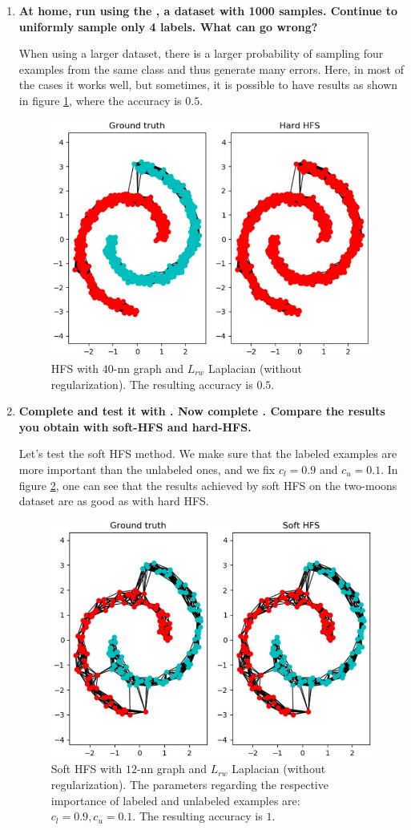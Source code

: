 \documentclass[a4paper, 11pt]{report}
\begin{document}
\begin{enumerate}
	\item \textbf{At home, run  using the , a dataset with 1000 samples. Continue to uniformly sample only 4 labels. What can go wrong?}
	
	When using a larger dataset, there is a larger probability of sampling four examples from the same class and thus generate many errors. Here, in most of the cases it works well, but sometimes, it is possible to have results as shown in figure \ref{fig:q12-hard-hfs-fail}, where the accuracy is $0.5$.
	
	\begin{figure}[!htb]
	    \centering
	    \includegraphics[width=.5\textwidth]{images/q12_hard-hfs-fail.jpg}
	    \caption{HFS with $40$-nn graph and $L_{rw}$ Laplacian (without regularization). The resulting accuracy is $0.5$.}
	    \label{fig:q12-hard-hfs-fail}
	\end{figure}
	
	\item \textbf{Complete  and test it with . Now complete . Compare the results you obtain with soft-HFS and hard-HFS.}
	
	Let's test the soft HFS method. We make sure that the labeled examples are more important than the unlabeled ones, and we fix $c_l = 0.9$ and $c_u = 0.1$. In figure \ref{fig:q13-soft-hfs}, one can see that the results achieved by soft HFS on the two-moons dataset are as good as with hard HFS.
	
	\begin{figure}[!htb]
	    \centering
	    \includegraphics[width=.5\textwidth]{images/q13_soft-hfs.jpg}
	    \caption{Soft HFS with $12$-nn graph and $L_{rw}$ Laplacian (without regularization). The parameters regarding the respective importance of labeled and unlabeled examples are: $c_l = 0.9, c_u = 0.1$. The resulting accuracy is $1$.}
	    \label{fig:q13-soft-hfs}
	\end{figure}
	

\end{enumerate}
\end{document}
